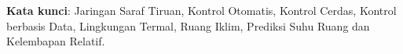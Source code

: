 \lipsum[100-101]

\vspace{0.5cm}
\hspace{-1.2cm}
\textbf{Kata kunci}: Jaringan Saraf Tiruan, Kontrol Otomatis, Kontrol Cerdas, Kontrol berbasis Data, Lingkungan Termal, Ruang Iklim, Prediksi Suhu Ruang dan Kelembapan Relatif.


